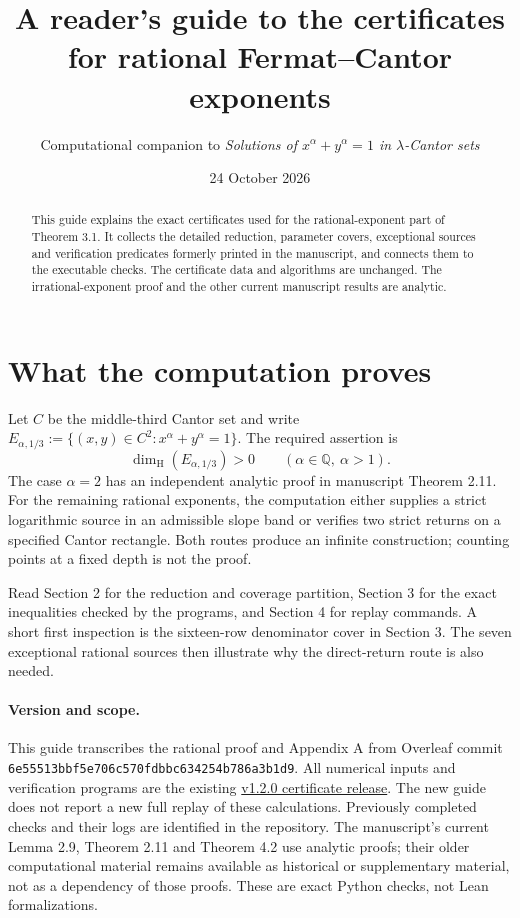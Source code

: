 \documentclass[11pt,a4paper]{article}
\title{A reader's guide to the certificates\\for rational Fermat--Cantor exponents}
\author{Computational companion to \emph{Solutions of $x^\alpha+y^\alpha=1$ in $\lambda$-Cantor sets}}
\date{24 October 2026}
\begin{document}
\maketitle
\begin{abstract}
This guide explains the exact certificates used for the rational-exponent
part of Theorem 3.1. It collects the detailed reduction, parameter covers,
exceptional sources and verification predicates formerly printed in the
manuscript, and connects them to the executable checks. The certificate
data and algorithms are unchanged. The irrational-exponent proof and the
other current manuscript results are analytic.
\end{abstract}
\tableofcontents

\section{What the computation proves}
Let $C$ be the middle-third Cantor set and write
$E_{\alpha,1/3}:=\{(x,y)\in C^2:x^\alpha+y^\alpha=1\}$.
The required assertion is
\[
\dim_{\mathrm H}(E_{\alpha,1/3})>0
\qquad(\alpha\in\mathbb Q,\ \alpha>1).
\]
The case $\alpha=2$ has an independent analytic proof in manuscript
Theorem 2.11. For the remaining rational exponents, the computation either
supplies a strict logarithmic source in an admissible slope band or
verifies two strict returns on a specified Cantor rectangle. Both routes
produce an infinite construction; counting points at a fixed depth is
not the proof.

Read Section 2 for the reduction and coverage partition, Section 3 for the
exact inequalities checked by the programs, and Section 4 for replay
commands. A short first inspection is the sixteen-row denominator cover
in Section 3. The seven exceptional rational sources then illustrate why
the direct-return route is also needed.

\paragraph{Version and scope.}
This guide transcribes the rational proof and Appendix A from Overleaf
commit \nolinkurl{6e55513bbf5e706c570fdbbc634254b786a3b1d9}.
All numerical inputs and verification programs are the existing
\href{https://github.com/Nero-17/LEAN-Formalisation-solutions-of-fermat-cantor-equation/tree/v1.2.0}{v1.2.0 certificate release}.
The new guide does not report a new full replay of these calculations.
Previously completed checks and their logs are identified in the repository.
The manuscript's current Lemma 2.9, Theorem 2.11 and Theorem 4.2 use
analytic proofs; their older computational material remains available as
historical or supplementary material, not as a dependency of those proofs.
These are exact Python checks, not Lean formalizations.
\end{document}
